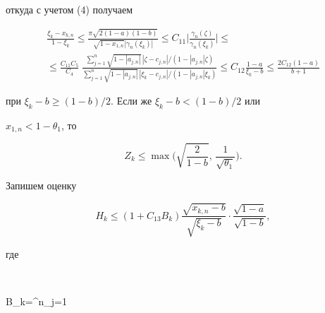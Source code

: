 откуда с учетом (4) получаем


\begin{multline}


\frac{\xi_k-x_{k,n}}{1-\xi_k}\le


\frac{\pi\sqrt{2(1-a)(1-b)}}{\sqrt{1-x_{1,n}}|\gamma_n(\xi_k)|}\le


C_{11}\biggl|\frac{\gamma_n(\zeta)}{\gamma_n(\xi_k)} \biggr|\le \\


%


\le\frac{C_{11}C_5}{C_4}\;


\frac{


\displaystyle\sum\limits^n_{j=1}


\sqrt{1-|a_{j,n}|}\,|\zeta-c_{j,n}|\Big/


(1-|a_{j,n}|\zeta)


}


{\displaystyle\sum\limits^n_{j=1}


\sqrt{1-|a_{j,n}|}\,|\xi_k-c_{j,n}|\Big/ (1-|a_{j,n}|\xi_k)


}\le


%


C_{12}\frac{1-a}{\xi_k-b}\le\frac{2C_{12}(1-a)}{b+1}


\end{multline}


при $\xi_k-b\ge(1-b)/2$. Если же $\xi_k-b<(1-b)/2$ или


$x_{1,n}<1-\theta_1$, то


\begin{equation}


Z_k\le\max\biggl(\sqrt{\frac{2}{1-b}},\,\frac{1}{\sqrt{\theta_1}}


\biggr).


\end{equation}





Запишем оценку


\begin{equation}


H_k\le(1+C_{13}B_k)\frac{\sqrt{x_{k,n}-b}}{\sqrt{\xi_k-b}}\cdot


\frac{\sqrt{1-a}}{\sqrt{1-b}},


\end{equation}


где


$$


B_k=\sum^n_{j=1}


